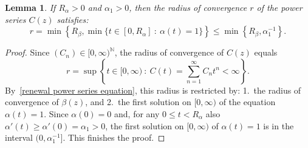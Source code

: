 \documentclass[letterpaper, DIV=17]{scrartcl}
\newtheorem{lemma}[theorem]{Lemma}
\numberwithin{equation}{section}
\theoremstyle{definition}
\begin{document}
		
		\begin{lemma}
			If $ R_\alpha > 0 $ and $ \alpha_1 > 0 $, then 
			the radius of convergence $ r $ of the power series $ C(z) $ satisfies:
			$$
			r = \min\left\{ R_\beta , \min\{ t \in [0,R_\alpha]    \ : \ \alpha(t) = 1 \} \right\}  \leq  \min\left\{ R_\beta , \alpha_1^{-1} \right\} .
			$$
		\end{lemma} 
		\begin{proof} Since $ (C_n) \in [0,\infty)^\mathbb{N}  $, the radius of convergence of $ C(z) $ equals
		$$
		r = \sup\left\{  t \in [0,\infty) \ : \ C(t) = \sum_{n=1}^\infty C_n t^n < \infty \right\} .
		$$
		By~\eqref{renewal power series equation}, this radius is restricted by: 1.~the radius of convergence of $ \beta(z) $, and 2.~the first solution on $[0,\infty) $ of the equation $ \alpha(t) = 1 $. Since  
		$ \alpha(0) = 0 $ and, for any $ 0\leq t < R_\alpha $ also  $ \alpha'(t) \geq \alpha'(0)  = \alpha_1 > 0 $, the first  solution on $[0,\infty) $ of $ \alpha(t) = 1 $ is in the interval $ (0, \alpha_1^{-1} ] $. This finishes the proof. 
		\end{proof}
		
\end{document}
